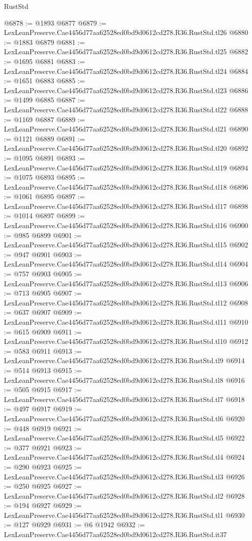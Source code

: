 \begin{lexlean}{RustStd}
\begin{coremodule}
@6878 := @1893 @6877
@6879 := LexLeanPreserve.Cae4456d77aa62528ed0bd9d0612cd278.R36.RustStd.tl26
@6880 := @1883 @6879
@6881 := LexLeanPreserve.Cae4456d77aa62528ed0bd9d0612cd278.R36.RustStd.tl25
@6882 := @1695 @6881
@6883 := LexLeanPreserve.Cae4456d77aa62528ed0bd9d0612cd278.R36.RustStd.tl24
@6884 := @1651 @6883
@6885 := LexLeanPreserve.Cae4456d77aa62528ed0bd9d0612cd278.R36.RustStd.tl23
@6886 := @1499 @6885
@6887 := LexLeanPreserve.Cae4456d77aa62528ed0bd9d0612cd278.R36.RustStd.tl22
@6888 := @1169 @6887
@6889 := LexLeanPreserve.Cae4456d77aa62528ed0bd9d0612cd278.R36.RustStd.tl21
@6890 := @1121 @6889
@6891 := LexLeanPreserve.Cae4456d77aa62528ed0bd9d0612cd278.R36.RustStd.tl20
@6892 := @1095 @6891
@6893 := LexLeanPreserve.Cae4456d77aa62528ed0bd9d0612cd278.R36.RustStd.tl19
@6894 := @1075 @6893
@6895 := LexLeanPreserve.Cae4456d77aa62528ed0bd9d0612cd278.R36.RustStd.tl18
@6896 := @1061 @6895
@6897 := LexLeanPreserve.Cae4456d77aa62528ed0bd9d0612cd278.R36.RustStd.tl17
@6898 := @1014 @6897
@6899 := LexLeanPreserve.Cae4456d77aa62528ed0bd9d0612cd278.R36.RustStd.tl16
@6900 := @985 @6899
@6901 := LexLeanPreserve.Cae4456d77aa62528ed0bd9d0612cd278.R36.RustStd.tl15
@6902 := @947 @6901
@6903 := LexLeanPreserve.Cae4456d77aa62528ed0bd9d0612cd278.R36.RustStd.tl14
@6904 := @757 @6903
@6905 := LexLeanPreserve.Cae4456d77aa62528ed0bd9d0612cd278.R36.RustStd.tl13
@6906 := @713 @6905
@6907 := LexLeanPreserve.Cae4456d77aa62528ed0bd9d0612cd278.R36.RustStd.tl12
@6908 := @637 @6907
@6909 := LexLeanPreserve.Cae4456d77aa62528ed0bd9d0612cd278.R36.RustStd.tl11
@6910 := @615 @6909
@6911 := LexLeanPreserve.Cae4456d77aa62528ed0bd9d0612cd278.R36.RustStd.tl10
@6912 := @583 @6911
@6913 := LexLeanPreserve.Cae4456d77aa62528ed0bd9d0612cd278.R36.RustStd.tl9
@6914 := @514 @6913
@6915 := LexLeanPreserve.Cae4456d77aa62528ed0bd9d0612cd278.R36.RustStd.tl8
@6916 := @505 @6915
@6917 := LexLeanPreserve.Cae4456d77aa62528ed0bd9d0612cd278.R36.RustStd.tl7
@6918 := @497 @6917
@6919 := LexLeanPreserve.Cae4456d77aa62528ed0bd9d0612cd278.R36.RustStd.tl6
@6920 := @448 @6919
@6921 := LexLeanPreserve.Cae4456d77aa62528ed0bd9d0612cd278.R36.RustStd.tl5
@6922 := @377 @6921
@6923 := LexLeanPreserve.Cae4456d77aa62528ed0bd9d0612cd278.R36.RustStd.tl4
@6924 := @290 @6923
@6925 := LexLeanPreserve.Cae4456d77aa62528ed0bd9d0612cd278.R36.RustStd.tl3
@6926 := @250 @6925
@6927 := LexLeanPreserve.Cae4456d77aa62528ed0bd9d0612cd278.R36.RustStd.tl2
@6928 := @194 @6927
@6929 := LexLeanPreserve.Cae4456d77aa62528ed0bd9d0612cd278.R36.RustStd.tl1
@6930 := @127 @6929
@6931 := @6 @1942
@6932 := LexLeanPreserve.Cae4456d77aa62528ed0bd9d0612cd278.R36.RustStd.it37

\end{coremodule}
\end{lexlean}
